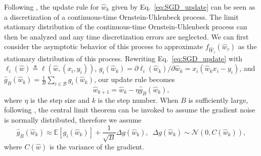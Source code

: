 \documentclass[12pt,onecolumn, margin=1in]{IEEEtran}
\newcommand{\E}[1]{\mathbb{E}\left[ #1 \right]}
\newcommand{\Wh}{\hat{W}}
\newcommand{\wh}{\hat{w}}
\begin{document}
Following \cite{MandtSGDBayes, MandtSGDVariational, Jastrzebski2017ThreeFI}, the update rule for $\hat w_k$ given by Eq.~\eqref{eq:SGD_update} can be seen as a discretization of a continuous-time Ornstein-Uhlenbeck process. The limit stationary distribution of the continuous-time Ornstein-Uhlenbeck process can then be analyzed and any time discretization errors are neglected. We can first consider the asymptotic behavior of this process to approximate $f_{\Wh_\tau}(\hat w_\tau)$ as the stationary distribution of this process. Rewriting Eq.~\eqref{eq:SGD_update} with $\ell_i(\wh) \triangleq \ell(\wh, (x_i, y_i))$, $g_i(\hat w_k) = \partial \ell_i(\hat w_k)/\partial \hat w_k = x_i(\hat w_k x_i-y_i)$, and $\hat g_B(\hat w_k) = \frac{1}{B} \sum_{i \in \mathcal{B}} g_i(\hat w_k)$, our update rule becomes
\begin{equation}
    \label{eq:short_SGD}
    \hat w_{k + 1} = \hat w_k - \eta \hat g_B(\hat w_k),
\end{equation}
where $\eta$ is the step size and $k$ is the step number. When $B$ is sufficiently large, following \cite{MandtSGDBayes, Jastrzebski2017ThreeFI}, the central limit theorem can be invoked to assume the gradient noise is normally distributed, therefore we assume 
\begin{equation}
    \hat g_B(\hat w_k) \approx \E{g_i(\hat w_k)} +\frac{1}{\sqrt{B}}\Delta g(\hat w_k), \,\,\, \Delta g(\hat w_k) \sim \mathcal{N}(0,C(\hat w_k)),
\end{equation}
where $C(\hat w)$ is the variance of the gradient.
\end{document}
